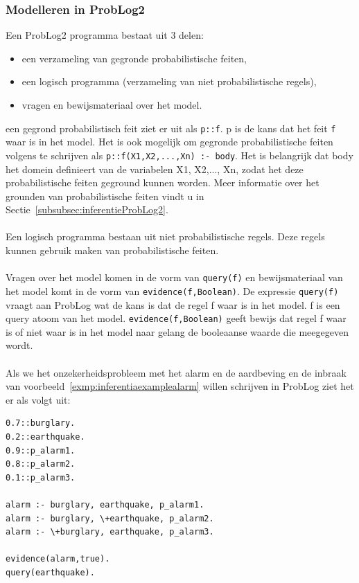 \documentclass[12pt,a4paper,oneside]{book}
\theoremstyle{definition}
\begin{document}
\subsubsection{Modelleren in ProbLog2}
\label{subsubsec:ModellereninProbLog2}
Een ProbLog2 programma bestaat uit 3 delen:
\begin{itemize}
	\item een verzameling van gegronde probabilistische feiten,
	\item een logisch programma (verzameling van niet probabilistische regels),
	\item vragen en bewijsmateriaal over het model.
\end{itemize}
een gegrond probabilistisch feit ziet er uit als \texttt{p::f}. p is de kans dat het feit \texttt{f} waar is in het model. Het is ook mogelijk om gegronde probabilistische feiten volgens te schrijven als \texttt{p::f(X1,X2,...,Xn) :- body}. Het is belangrijk dat body het domein definieert van de variabelen X1, X2,..., Xn, zodat het deze probabilistische feiten geground kunnen worden. Meer informatie over het grounden van probabilistische feiten vindt u in Sectie~\ref{subsubsec:inferentieProbLog2}.
\\\\
Een logisch programma bestaan uit niet probabilistische regels. Deze regels kunnen gebruik maken van probabilistische feiten.
\\\\
Vragen over het model komen in de vorm van \texttt{query(f)} en bewijsmateriaal van het model komt in de vorm van \texttt{evidence(f,Boolean)}. De expressie \texttt{query(f)} vraagt aan ProbLog wat de kans is dat de regel f waar is in het model. f is een query atoom van het model. \texttt{evidence(f,Boolean)} geeft bewijs dat regel f waar is of niet waar is in het model naar gelang de booleaanse waarde die meegegeven wordt.
\\\\
Als we het onzekerheidsprobleem met het alarm en de aardbeving en de inbraak van voorbeeld~\ref{exmp:inferentiaexamplealarm} willen schrijven in ProbLog ziet het er als volgt uit:
\begin{verbatim}
0.7::burglary.
0.2::earthquake.
0.9::p_alarm1.
0.8::p_alarm2.
0.1::p_alarm3.

alarm :- burglary, earthquake, p_alarm1.
alarm :- burglary, \+earthquake, p_alarm2.
alarm :- \+burglary, earthquake, p_alarm3.

evidence(alarm,true).
query(earthquake).
\end{verbatim}
\end{document}
